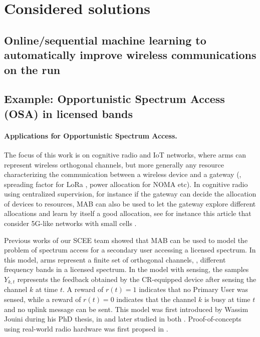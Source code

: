 \section{Considered solutions}
\label{sec:1:solutions}



\subsection{Online/sequential machine learning to automatically improve wireless communications on the run}

\subsection{Example: Opportunistic Spectrum Access (OSA) in licensed bands}


\paragraph{Applications for Opportunistic Spectrum Access.}

The focus of this work is on cognitive radio and IoT networks, where arms can represent wireless orthogonal channels, but more generally any resource characterizing the communication between a wireless device and a gateway (\eg, spreading factor for LoRa \cite{KerkoucheAlami18}, power allocation for NOMA etc). In cognitive radio using centralized supervision, for instance if the gateway can decide the allocation of devices to resources, MAB can also be used to let the gateway explore different allocations and learn by itself a good allocation, see for instance this article that consider 5G-like networks with small cells \cite{Maghsudi16}.

Previous works of our SCEE team showed that MAB can be used to model the problem of spectrum access for a secondary user accessing a licensed spectrum.
In this model, arms represent a finite set of orthogonal channels, \ie, different frequency bands in a licensed spectrum.
In the model with sensing, the samples $Y_{k,t}$ represents the feedback obtained by the CR-equipped device after sensing the channel $k$ at time $t$.
A reward of $r(t) = 1$ indicates that no Primary User was sensed, while a reward of $r(t)=0$ indicates that the channel $k$ is busy at time $t$ and no uplink message can be sent.
%
This model was first introduced by Wassim Jouini during his PhD thesis,
in \cite{Jouini09} and later studied in both \cite{Jouini10,Jouini12}.
Proof-of-concepts using real-world radio hardware was first propsed in \cite{MoyWSR2014,RobertSDR2014}.

